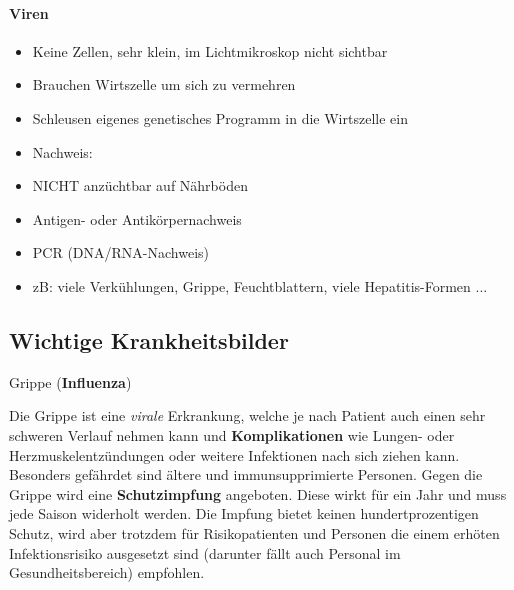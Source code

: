 \documentclass{article}
\newcommand\gEs[1]{\textbf{\textcolor[rgb]{0.0,0.0,0.5019608}{#1}}}
\newcommand\gEs[1]{\textbf{\textcolor[rgb]{0.0,0.0,0.5019608}{#1}}}
\newcommand\gT[1]{\textbf{\textup{\textcolor[rgb]{0.0,0.5019608,0.0}{#1}}}}
\newcommand\gE[1]{\textit{#1}}
\newcommand\gZ[1]{\textcolor[rgb]{0.5019608,0.5019608,0.5019608}{#1}}
\begin{document}
\paragraph[Viren]{Viren}
\begin{itemize}
\item {\mdseries
Keine Zellen, sehr klein, im Lichtmikroskop nicht sichtbar}

\item {\mdseries
Brauchen Wirtszelle um sich zu vermehren}

\item {\mdseries
Schleusen eigenes genetisches Programm in die Wirtszelle ein}

\item {\mdseries
\gZ{Nachweis:}}

\end{itemize}
\begin{itemize}
\item {\mdseries
\gZ{NICHT anz\"uchtbar auf N\"ahrb\"oden}}

\item {\mdseries
\gZ{Antigen- oder Antik\"orpernachweis}}

\item {\mdseries
\gZ{PCR (DNA/RNA-Nachweis)}}

\end{itemize}
\begin{itemize}
\item {\mdseries
zB: viele Verk\"uhlungen, Grippe, Feuchtblattern, viele Hepatitis-Formen
...}

\end{itemize}
\subsection{Wichtige Krankheitsbilder}
{\mdseries\color[rgb]{0.0,0.0,0.5019608}
Grippe
(\gT{Influenza})}

{\mdseries
Die Grippe ist eine \gE{virale} Erkrankung, welche je
nach Patient auch einen sehr schweren Verlauf nehmen kann und
\gEs{Komplikationen} wie Lungen- oder 
Herzmuskelentz\"undungen oder weitere Infektionen nach sich ziehen
kann. Besonders gef\"ahrdet sind \"altere und immunsupprimierte
Personen. Gegen die Grippe wird eine
\gEs{Schutzimpfung} angeboten. Diese wirkt f\"ur
ein Jahr und muss jede Saison widerholt werden. Die Impfung bietet
keinen hundertprozentigen Schutz, wird aber trotzdem f\"ur
Risikopatienten und Personen die einem erh\"oten Infektionsrisiko
ausgesetzt sind (darunter f\"allt auch Personal im Gesundheitsbereich)
empfohlen. }
\end{document}
